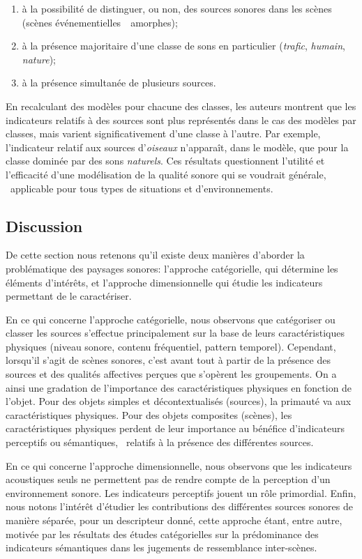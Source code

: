 \begin{enumerate}
\item à la possibilité de distinguer, ou non, des sources sonores dans les scènes (scènes événementielles~\vs~amorphes);
\item à la présence majoritaire d'une classe de sons en particulier (\emph{trafic}, \emph{humain}, \emph{nature});
\item à la présence simultanée de plusieurs sources.
\end{enumerate}

En recalculant des modèles pour chacune des classes, les auteurs montrent que les indicateurs relatifs à des sources sont plus représentés dans le cas des modèles par classes, mais varient significativement d'une classe à l'autre. Par exemple, l’indicateur relatif aux sources d'\emph{oiseaux} n'apparaît, dans le modèle, que pour la classe dominée par des sons \emph{naturels}. Ces résultats questionnent l'utilité et l'efficacité d'une modélisation de la qualité sonore qui se voudrait générale, \ie~applicable pour tous types de situations et d'environnements.

\subsection{Discussion}
\label{sec:ch3_soundscapeDiscussion}

De cette section nous retenons qu'il existe deux manières d'aborder la problématique des paysages sonores: l'approche catégorielle, qui détermine les éléments d'intérêts, et l'approche dimensionnelle qui étudie les indicateurs permettant de le caractériser.

En ce qui concerne l'approche catégorielle, nous observons que catégoriser ou classer les sources s'effectue principalement sur la base de leurs caractéristiques physiques (niveau sonore, contenu fréquentiel, pattern temporel). Cependant, lorsqu'il s'agit de scènes sonores, c'est avant tout à partir de la présence des sources et des qualités affectives perçues que s'opèrent les groupements. On a ainsi une gradation de l'importance des caractéristiques physiques en fonction de l'objet. Pour des objets simples et décontextualisés (sources), la primauté va aux caractéristiques physiques. Pour des objets composites (scènes), les caractéristiques physiques perdent de leur importance au bénéfice d'indicateurs perceptifs ou sémantiques, \ie~relatifs à la présence des différentes sources.

En ce qui concerne l'approche dimensionnelle, nous observons que les indicateurs acoustiques seuls ne permettent pas de rendre compte de la perception d'un environnement sonore. Les indicateurs perceptifs jouent un rôle primordial. Enfin, nous notons l'intérêt d'étudier les contributions des différentes sources sonores de manière séparée, pour un descripteur donné, cette approche étant, entre autre, motivée par les résultats des études catégorielles sur la prédominance des indicateurs sémantiques dans les jugements de ressemblance inter-scènes.

